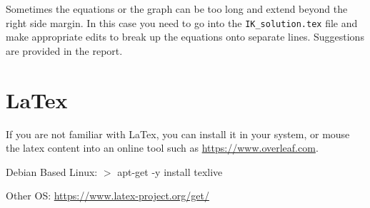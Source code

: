 \documentclass[letterpaper]{article}
\begin{document}
Sometimes the equations or the graph can be too long and extend beyond the right side margin.   In this case you need to go into the {\tt IK\_solution.tex} file and make appropriate edits to break up the equations onto separate lines.  Suggestions are provided in the report. 


\section{LaTex}
If you are not familiar with LaTex, you can install it in your system, or mouse the latex content into an online tool such as \url{https://www.overleaf.com}.

Debian Based Linux:   $>$ apt-get -y install texlive
  
Other OS:  \url{https://www.latex-project.org/get/}
\end{document}
